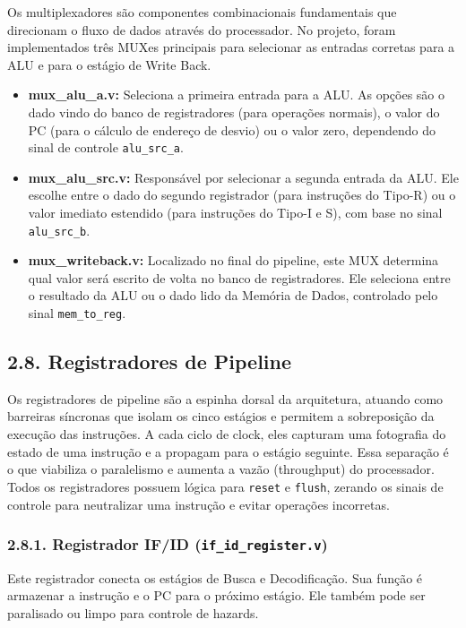 \documentclass[12pt, a4paper]{article}
\begin{document}
Os multiplexadores são componentes combinacionais fundamentais que direcionam o fluxo de dados através do processador. No projeto, foram implementados três MUXes principais para selecionar as entradas corretas para a ALU e para o estágio de Write Back.

\begin{itemize}
    \item \textbf{mux\_alu\_a.v:} Seleciona a primeira entrada para a ALU. As opções são o dado vindo do banco de registradores (para operações normais), o valor do PC (para o cálculo de endereço de desvio) ou o valor zero, dependendo do sinal de controle \texttt{alu\_src\_a}.

    \item \textbf{mux\_alu\_src.v:} Responsável por selecionar a segunda entrada da ALU. Ele escolhe entre o dado do segundo registrador (para instruções do Tipo-R) ou o valor imediato estendido (para instruções do Tipo-I e S), com base no sinal \texttt{alu\_src\_b}.

    \item \textbf{mux\_writeback.v:} Localizado no final do pipeline, este MUX determina qual valor será escrito de volta no banco de registradores. Ele seleciona entre o resultado da ALU ou o dado lido da Memória de Dados, controlado pelo sinal \texttt{mem\_to\_reg}.
\end{itemize}

\subsection*{2.8. Registradores de Pipeline}

Os registradores de pipeline são a espinha dorsal da arquitetura, atuando como barreiras síncronas que isolam os cinco estágios e permitem a sobreposição da execução das instruções. A cada ciclo de clock, eles capturam uma fotografia do estado de uma instrução e a propagam para o estágio seguinte. Essa separação é o que viabiliza o paralelismo e aumenta a vazão (throughput) do processador. Todos os registradores possuem lógica para \texttt{reset} e \texttt{flush}, zerando os sinais de controle para neutralizar uma instrução e evitar operações incorretas.

\subsubsection*{2.8.1. Registrador IF/ID (\texttt{if\_id\_register.v})}
Este registrador conecta os estágios de Busca e Decodificação. Sua função é armazenar a instrução e o PC para o próximo estágio. Ele também pode ser paralisado ou limpo para controle de hazards.
\end{document}
